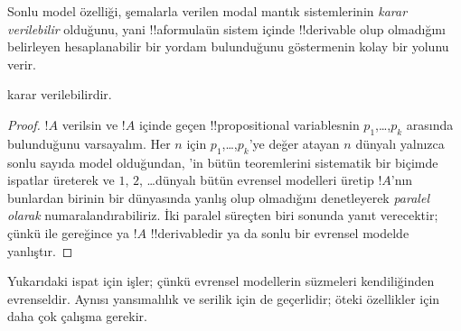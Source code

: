 


Sonlu model özelliği, şemalarla verilen modal mantık sistemlerinin
\emph{karar verilebilir} olduğunu, yani !!a{formula}{}ün sistem içinde
!!{derivable} olup olmadığını belirleyen hesaplanabilir bir yordam
bulunduğunu göstermenin kolay bir yolunu verir.

\begin{thm}
   karar verilebilirdir.
\end{thm}

\begin{proof}
  $!A$ verilsin ve $!A$ içinde geçen !!{propositional variable}s{}nin
  $p_1$,\dots,$p_k$ arasında bulunduğunu varsayalım. Her $n$ için
  $p_1$,\dots,$p_k$'ye değer atayan $n$ dünyalı yalnızca sonlu sayıda model
  olduğundan, 'in bütün teoremlerini sistematik bir biçimde
  ispatlar üreterek ve $1$, $2$, \dots dünyalı bütün evrensel modelleri üretip
  $!A$'nın bunlardan birinin bir dünyasında yanlış olup olmadığını denetleyerek
  \emph{paralel olarak} numaralandırabiliriz. İki paralel süreçten biri
  sonunda yanıt verecektir; çünkü
   ile  gereğince ya
  $!A$ !!{derivable}{}dir ya da sonlu bir evrensel modelde yanlıştır.
\end{proof}

Yukarıdaki ispat  için işler; çünkü evrensel modellerin süzmeleri
kendiliğinden evrenseldir. Aynısı yansımalılık ve serilik için de geçerlidir;
öteki özellikler için daha çok çalışma gerekir.

